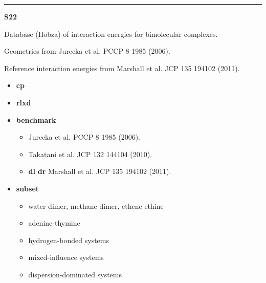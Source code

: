 \documentclass[letterpaper,10pt,english]{sphinxmanual}
\begin{document}
\bigskip\hrule{}\bigskip

\label{db:module-S22}
\textbf{S22}

\begin{DUlineblock}{0em}
\item[] Database (Hobza) of interaction energies for bimolecular complexes.
\item[] Geometries from Jurecka et al. PCCP 8 1985 (2006).
\item[] Reference interaction energies from Marshall et al. JCP 135 194102 (2011).
\end{DUlineblock}
\begin{itemize}
\item {} 
\textbf{cp}   \textbar{}\textbar{} 

\item {} 
\textbf{rlxd} 

\item {} 
\textbf{benchmark}
\begin{itemize}
\item {} 
 Jurecka et al. PCCP 8 1985 (2006).

\item {} 
 Takatani et al. JCP 132 144104 (2010).

\item {} 
{\color{red}\bfseries{}\textbar{}dl\textbar{}}  {\color{red}\bfseries{}\textbar{}dr\textbar{}} Marshall et al. JCP 135 194102 (2011).

\end{itemize}

\item {} 
\textbf{subset}
\begin{itemize}
\item {} 
 water dimer, methane dimer, ethene-ethine

\item {} 
 adenine-thymine

\item {} 
 hydrogen-bonded systems

\item {} 
 mixed-influence systems

\item {} 
 dispersion-dominated systems

\end{itemize}

\end{itemize}
\end{document}
